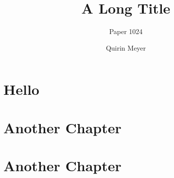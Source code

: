 \documentclass[a4paper]{tufte-book}
\begin{document}
\title{A Long Title}

{
  \author{Paper 1024}  
}
{
\author{Quirin Meyer}
}
\frontmatter
\maketitle
\tableofcontents
\mainmatter
\chapter{Hello}

\chapter{Another Chapter}
\chapter{Another Chapter}
\backmatter


\end{document}
